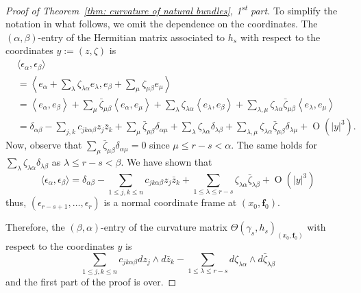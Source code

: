 \documentclass[a4paper]{amsart}
\theoremstyle{plain}%
\theoremstyle{definition}
\theoremstyle{remark}
\begin{document}
\begin{proof}[Proof of Theorem~\ref{thm: curvature of natural bundles}, 1\textsuperscript{st} part]
	To simplify the notation in what follows, we omit the dependence on the coordinates.
	The $ (\alpha,\beta) $-entry of the Hermitian matrix associated to $ h_s $ with respect to the coordinates $ y := (z,\zeta) $ is
	\begin{equation}\label{eq: metric of tautological frame}
		\begin{split}
			&\langle \epsilon_\alpha, \epsilon_\beta \rangle \\
			&= \left< e_\alpha + \sum_{\lambda} \zeta_{\lambda\alpha} e_\lambda, e_\beta + \sum_{\mu} \zeta_{\mu\beta} e_\mu  \right> \\
			&= \left< e_\alpha, e_\beta \right> +
			\sum_{\mu} \bar{\zeta}_{\mu\beta} \left< e_\alpha, e_\mu  \right> +
			\sum_{\lambda} \zeta_{\lambda\alpha} \left< e_\lambda, e_\beta \right> +
			\sum_{\lambda,\mu} \zeta_{\lambda\alpha} \bar{\zeta}_{\mu\beta} \left< e_\lambda, e_\mu  \right> \\
			&= \delta_{\alpha\beta} - \sum_{j,k} c_{jk\alpha\beta} z_j \bar{z}_k + \sum_{\mu} \bar{\zeta}_{\mu\beta} \delta_{\alpha\mu} + \sum_{\lambda} \zeta_{\lambda\alpha} \delta_{\lambda\beta} + \sum_{\lambda,\mu} \zeta_{\lambda\alpha}\bar{\zeta}_{\mu\beta} \delta_{\lambda\mu} + \operatorname{O}(|y|^3) .
		\end{split}
	\end{equation}
	Now, observe that $ \sum_{\mu} \bar{\zeta}_{\mu\beta} \delta_{\alpha\mu} = 0 $ since $ \mu \le r-s < \alpha $.
	The same holds for $ \sum_{\lambda} \zeta_{\lambda\alpha} \delta_{\lambda\beta} $ as $ \lambda \le r-s < \beta $.
	We have shown that
	\begin{equation*}
		\langle \epsilon_\alpha, \epsilon_\beta \rangle = \delta_{\alpha\beta} - \sum_{1 \le j,k \le n} c_{jk\alpha\beta} z_j \bar{z}_k + \sum_{1 \le \lambda \le r-s} \zeta_{\lambda\alpha}\bar{\zeta}_{\lambda\beta} + \operatorname{O}(|y|^3)
	\end{equation*}
	thus, $ (\epsilon_{r-s+1},\dots,\epsilon_r) $ is a normal coordinate frame at $ (x_0,\mathbf{f}_0) $.
	
	Therefore, the $ (\beta,\alpha) $-entry of the curvature matrix $ \Theta(\gamma_{s},h_s)_{(x_0,\mathbf{f}_0)} $ with respect to the coordinates $ y $ is
	\begin{equation*}
		\sum_{1 \le j,k \le n} c_{jk\alpha\beta} dz_j \wedge d\bar{z}_k - \sum_{1 \le \lambda \le r-s} d\zeta_{\lambda\alpha} \wedge d\bar{\zeta}_{\lambda\beta}
	\end{equation*}
	and the first part of the proof is over.
\end{proof}
\end{document}

